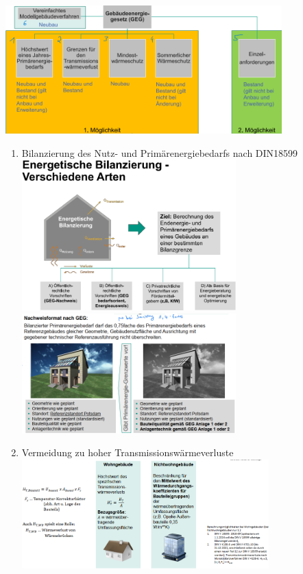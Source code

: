 \documentclass[fleqn,twoside,dvipsnames]{article}
\begin{document}
\begin{itemize}
                \includegraphics[width=0.8\textwidth]{Grafiken/ES/Anforderungen GEG.png}
                \begin{enumerate}
                    \item Bilanzierung des Nutz- und Primärenergiebedarfs nach DIN18599\\
                        \includegraphics[width=0.65\textwidth]{Grafiken/ES/Varianten energetische Bilanzierung.png}\\
                        \includegraphics[width=0.65\textwidth]{Grafiken/ES/Primaerenergiebedarf Nachweisformat nach GEG.png}
                        \newpage
                    \item Vermeidung zu hoher Transmissionswärmeverluste\\
                        \includegraphics[width=0.75\textwidth]{Grafiken/ES/Transmissionswaermeverlust Grenzen GEG.png}

\end{enumerate}
\end{itemize}
\end{document}
